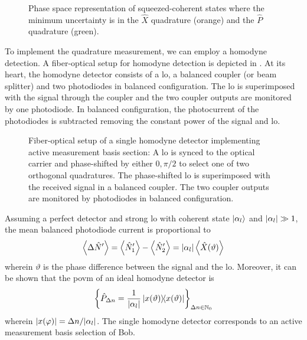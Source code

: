 \begin{figure}[htb]
	\centering
	
	\caption{Phase space representation of squeezed-coherent states where the minimum uncertainty is in the $\hat{X}$ quadrature (orange) and the $\hat{P}$ quadrature (green).}\label{fig:state_space_squeezed_quadrature}
\end{figure}
To implement the quadrature measurement, we can employ a homodyne detection.
A fiber-optical setup for homodyne detection is depicted in .
At its heart, the homodyne detector consists of a \gls{lo}, a balanced coupler (or beam splitter) and two photodiodes in balanced configuration.
The \gls{lo} is superimposed with the signal through the coupler and the two coupler outputs are monitored by one photodiode.
In balanced configuration, the photocurrent of the photodiodes is subtracted removing the constant power of the signal and \gls{lo}.
\begin{figure}[htb]
	\centering
	
	\caption{Fiber-optical setup of a single homodyne detector implementing active measurement basis section: A \gls{lo} is synced to the optical carrier and phase-shifted by either $0,\pi/2$ to select one of two orthogonal quadratures. The phase-shifted \gls{lo} is superimposed with the received signal in a balanced coupler. The two coupler outputs are monitored by photodiodes in balanced configuration.}\label{fig:coherent_receiver_active}
\end{figure}
Assuming a perfect detector and strong \gls{lo} with coherent state $\ket{\alpha_l}$ and $\abs{\alpha_l}\gg1$, the mean balanced photodiode current is proportional to~\cite[p.~217]{Vogel2006}
\begin{equation*}
	\expval{\Delta\hat{N}^\prime}
	=
	\expval{\hat{N}_1^\prime}
	-
	\expval{\hat{N}_2^\prime}
	=
	\abs{\alpha_l}
	\expval{\hat{X}(\vartheta)}
\end{equation*}
wherein $\vartheta$ is the phase difference between the signal and the \gls{lo}.
Moreover, it can be shown that the \gls{povm} of an ideal homodyne detector is~\cite[p.~220]{Vogel2006}
\begin{equation}
	\left\{\hat{P}_{\Delta n}=\frac{1}{\abs{\alpha_l}}\ketbra{x(\vartheta)}\right\}_{\Delta n\in\mathbb{N}_0}
\end{equation}
wherein $\abs{x(\varphi)}=\Delta n/\abs{\alpha_l}$.
The single homodyne detector corresponds to an active measurement basis selection of Bob.
